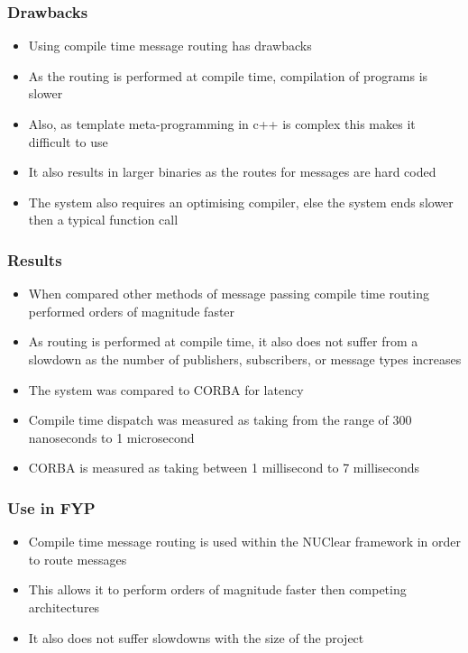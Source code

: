 \documentclass{beamer}
\begin{document}
	\begin{frame}
		\frametitle{Drawbacks}
		\begin{itemize}
			\item Using compile time message routing has drawbacks
			\item As the routing is performed at compile time, compilation of programs is slower
			\item Also, as template meta-programming in c++ is complex this makes it difficult to use
			\item It also results in larger binaries as the routes for messages are hard coded
			\item The system also requires an optimising compiler, else the system ends slower then a typical function call
		\end{itemize}
	\end{frame}
	
	\begin{frame}
		\frametitle{Results}
		\begin{itemize}
			\item When compared other methods of message passing compile time routing performed orders of magnitude faster
			\item As routing is performed at compile time, it also does not suffer from a slowdown as the number of publishers, subscribers, or message types increases
			\item The system was compared to CORBA for latency
			\item Compile time dispatch was measured as taking from the range of 300 nanoseconds to 1 microsecond
			\item CORBA is measured as taking between 1 millisecond to 7 milliseconds
		\end{itemize}
	\end{frame}
	
	\begin{frame}
		\frametitle{Use in FYP}
		\begin{itemize}
			\item Compile time message routing is used within the NUClear framework in order to route messages
			\item This allows it to perform orders of magnitude faster then competing architectures
			\item It also does not suffer slowdowns with the size of the project
		\end{itemize}
	\end{frame}
	
\end{document}

